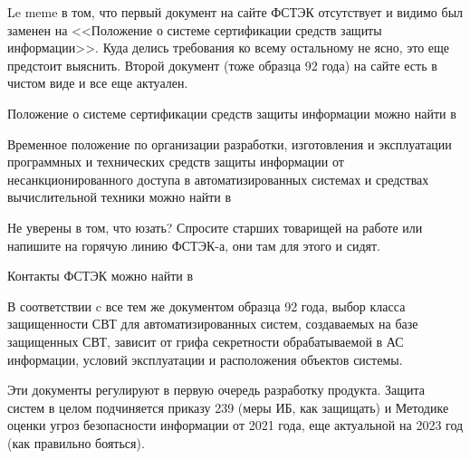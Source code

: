 Le meme в том, что первый документ на сайте ФСТЭК отсутствует и видимо был заменен на <<Положение о системе сертификации средств защиты информации>>. Куда делись требования ко всему остальному не ясно, это еще предстоит выяснить. Второй документ (тоже образца 92 года) на сайте есть в чистом виде и все еще актуален.

Положение о системе сертификации средств защиты информации можно найти в \cite{FSTECCertificationSystem}

Временное положение по организации разработки, изготовления и эксплуатации программных и технических средств защиты информации от несанкционированного доступа в автоматизированных системах и средствах вычислительной техники можно найти в \cite{GTKTemporaryRegulation}

Не уверены в том, что юзать? Спросите старших товарищей на работе или напишите на горячую линию ФСТЭК-а, они там для этого и сидят.

Контакты ФСТЭК можно найти в \cite{FSTECContacts}

В соответствии c все тем же документом образца 92 года, выбор класса защищенности СВТ для автоматизированных систем, создаваемых на базе защищенных СВТ, зависит от грифа секретности обрабатываемой в АС информации, условий эксплуатации и расположения объектов системы.

Эти документы регулируют в первую очередь разработку продукта. Защита систем в целом подчиняется приказу 239 (меры ИБ, как защищать) и Методике оценки угроз безопасности информации от 2021 года, еще актуальной на 2023 год (как правильно бояться).

